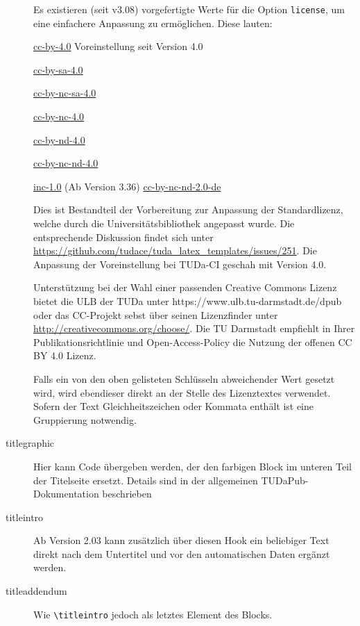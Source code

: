 \documentclass[
	german,%
	ruledheaders=section,%
	class=report,%
	thesis={type=bachelor},%
	accentcolor=9c,%
	custommargins=true,%
	marginpar=false,%
	parskip=half-,%
	fontsize=11pt,%
]{tudapub}
\let\code\texttt
\let\tbs\textbackslash
\begin{document}
\begin{description}
	      Es existieren (seit v3.08) vorgefertigte Werte für die Option \verb|license|, um eine einfachere Anpassung zu ermöglichen. Diese lauten:

	      \parbox[t]{.5\linewidth}{%
		      \ttfamily
		      \href{https://creativecommons.org/licenses/by/4.0/}{cc-by-4.0} \textnormal{Voreinstellung seit Version 4.0}\par
		      \href{https://creativecommons.org/licenses/by-sa/4.0/}{cc-by-sa-4.0}\par
		      \href{https://creativecommons.org/licenses/by-nc-sa/4.0/}{cc-by-nc-sa-4.0}\par
		      \href{https://creativecommons.org/licenses/by-nc-/4.0/}{cc-by-nc-4.0}\par
	      }%
	      \parbox[t]{.5\linewidth}{
		      \ttfamily
		      \href{https://creativecommons.org/licenses/by-nd/4.0/}{cc-by-nd-4.0}\par
		      \href{https://creativecommons.org/licenses/by-nc-nd/4.0/}{cc-by-nc-nd-4.0}\par
		      \href{https://rightsstatements.org/page/InC/1.0/}{inc-1.0}\textnormal{ (Ab Version 3.36)}
		      \href{https://creativecommons.org/licenses/by-nc-nd/2.0/}{cc-by-nc-nd-2.0-de}\par
	      }

	      Dies ist Bestandteil der Vorbereitung zur Anpassung der Standardlizenz, welche durch die Universitätsbibliothek angepasst wurde.
	      Die entsprechende Diskussion findet sich unter \url{https://github.com/tudace/tuda_latex_templates/issues/251}. Die Anpassung der Voreinstellung bei TUDa-CI geschah mit Version 4.0.

	      Unterstützung bei der Wahl einer passenden Creative Commons Lizenz bietet die ULB der TUDa unter https://www.ulb.tu-darmstadt.de/dpub  oder  das CC-Projekt sebst über seinen Lizenzfinder unter \url{http://creativecommons.org/choose/}.
	      Die TU Darmstadt empfiehlt in Ihrer Publikationsrichtlinie und Open-Access-Policy die Nutzung der offenen CC BY 4.0 Lizenz.

	      Falls ein von den oben gelisteten Schlüsseln abweichender Wert gesetzt wird, wird ebendieser direkt an der Stelle des Lizenztextes verwendet. Sofern der Text Gleichheitszeichen oder Kommata enthält ist eine Gruppierung notwendig.
	\item[titlegraphic] Hier kann Code übergeben werden, der den farbigen Block im unteren Teil der Titelseite ersetzt. Details sind in der allgemeinen TUDaPub-Dokumentation beschrieben \cite{tudapub}
	\item[titleintro] Ab Version 2.03 kann zusätzlich über diesen Hook ein beliebiger Text direkt nach dem Untertitel und vor den automatischen Daten ergänzt werden.
	\item[titleaddendum] Wie \code{\tbs{}titleintro} jedoch als letztes Element des Blocks.
\end{description}
\end{document}
